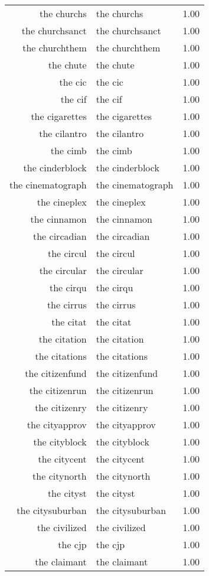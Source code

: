 \begin{table}[ht]
\begin{tabular}{rlr}
  the churchs & the churchs & 1.00 \\ 
  the churchsanct & the churchsanct & 1.00 \\ 
  the churchthem & the churchthem & 1.00 \\ 
  the chute & the chute & 1.00 \\ 
  the cic & the cic & 1.00 \\ 
  the cif & the cif & 1.00 \\ 
  the cigarettes & the cigarettes & 1.00 \\ 
  the cilantro & the cilantro & 1.00 \\ 
  the cimb & the cimb & 1.00 \\ 
  the cinderblock & the cinderblock & 1.00 \\ 
  the cinematograph & the cinematograph & 1.00 \\ 
  the cineplex & the cineplex & 1.00 \\ 
  the cinnamon & the cinnamon & 1.00 \\ 
  the circadian & the circadian & 1.00 \\ 
  the circul & the circul & 1.00 \\ 
  the circular & the circular & 1.00 \\ 
  the cirqu & the cirqu & 1.00 \\ 
  the cirrus & the cirrus & 1.00 \\ 
  the citat & the citat & 1.00 \\ 
  the citation & the citation & 1.00 \\ 
  the citations & the citations & 1.00 \\ 
  the citizenfund & the citizenfund & 1.00 \\ 
  the citizenrun & the citizenrun & 1.00 \\ 
  the citizenry & the citizenry & 1.00 \\ 
  the cityapprov & the cityapprov & 1.00 \\ 
  the cityblock & the cityblock & 1.00 \\ 
  the citycent & the citycent & 1.00 \\ 
  the citynorth & the citynorth & 1.00 \\ 
  the cityst & the cityst & 1.00 \\ 
  the citysuburban & the citysuburban & 1.00 \\ 
  the civilized & the civilized & 1.00 \\ 
  the cjp & the cjp & 1.00 \\ 
  the claimant & the claimant & 1.00 \\ 

\end{tabular}
\end{table}
